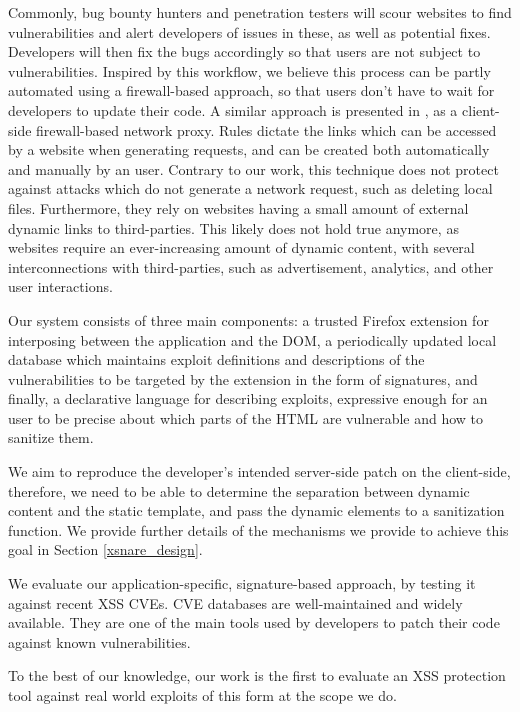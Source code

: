 Commonly, bug bounty hunters and penetration testers will scour
websites to find vulnerabilities and alert developers of issues in
these, as well as potential fixes. Developers will then fix the bugs
accordingly so that users are not subject to vulnerabilities. Inspired
by this workflow, we believe this process can be partly automated
using a firewall-based approach, so that users don't have to wait for
developers to update their code. A similar approach is presented in \cite{Kirda:2009:CCS:2639535.2639808}, as a client-side firewall-based 
network proxy. Rules dictate the links which can be accessed by a website
when generating requests, and can be created both automatically and manually
by an user. Contrary to our work, this technique does not protect against
attacks which do not generate a network request, such as deleting local
files. Furthermore, they rely on websites having a small amount of external
dynamic links to third-parties. This likely does not hold true anymore, 
as websites require an ever-increasing amount of dynamic content, with 
several interconnections with third-parties, such as advertisement, analytics,
and other user interactions.

Our system consists of three main components: a trusted Firefox
extension for interposing between the application and the DOM, a
periodically updated local database which maintains exploit
definitions and descriptions of the vulnerabilities to be targeted by
the extension in the form of signatures, and finally, a declarative
language for describing exploits, expressive enough for an user to be
precise about which parts of the HTML are vulnerable and how to
sanitize them.

We aim to reproduce the developer's intended server-side patch on the
client-side, therefore, we need to be able to determine the separation
between dynamic content and the static template, and pass the dynamic
elements to a sanitization function. We provide further details of the
mechanisms we provide to achieve this goal in Section
\ref{xsnare_design}.

We evaluate our application-specific, signature-based approach, by
testing it against recent \ac{XSS} CVEs. CVE databases are well-maintained
and widely available. They are one of the main tools used by
developers to patch their code against known vulnerabilities. 


To the
best of our knowledge, our work is the first to evaluate an \ac{XSS}
protection tool against real world exploits of this form at the scope
we do.


